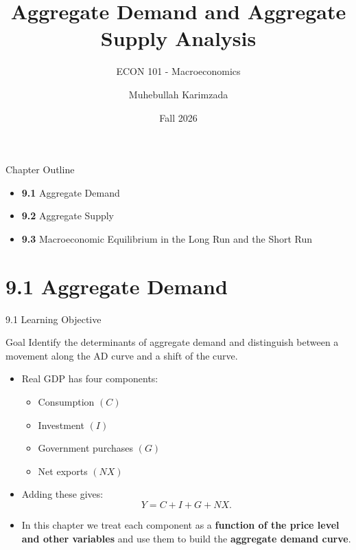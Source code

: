 \documentclass[aspectratio=169]{beamer}
\title{\textbf{Aggregate Demand and Aggregate Supply Analysis \vspace{.5cm}\\  }}
\subtitle{ {\large ECON 101 - Macroeconomics}}
\author{Muhebullah Karimzada}
\date{Fall 2026}
\begin{document}
\begin{frame}[plain]
  \titlepage
\end{frame}

\begin{frame}{Chapter Outline}
\transfade
\begin{itemize}[<+->]
  \item \textbf{9.1} Aggregate Demand
  \item \textbf{9.2} Aggregate Supply
  \item \textbf{9.3} Macroeconomic Equilibrium in the Long Run and the Short Run
\end{itemize}
\end{frame}

\section{9.1 Aggregate Demand}

\begin{frame}{9.1 Learning Objective}
\transfade
\begin{block}{Goal}
Identify the determinants of aggregate demand and distinguish between a movement along the AD curve and a shift of the curve.
\end{block}
\begin{itemize}[<+->]
  \item Real GDP has four components:
  \begin{itemize}[<+->]
    \item Consumption \((C)\)
    \item Investment \((I)\)
    \item Government purchases \((G)\)
    \item Net exports \((NX)\)
  \end{itemize}
  \item Adding these gives:
  \[
    Y = C + I + G + NX.
  \]
  \item In this chapter we treat each component as a \textbf{function of the price level and other variables} and use them to build the \textbf{aggregate demand curve}.
\end{itemize}
\end{frame}
\end{document}
